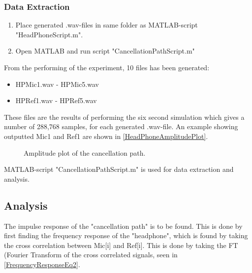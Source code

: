 \subsubsection{Data Extraction}
\begin{enumerate}
	\item Place generated .wav-files in same folder as MATLAB\textsuperscript{\textregistered}-script "HeadPhoneScript.m".
	\item Open MATLAB\textsuperscript{\textregistered} and run script "CancellationPathScript.m"
\end{enumerate}

From the performing of the experiment, 10 files has been generated:
\begin{itemize}
	\item HPMic1.wav - HPMic5.wav
	\item HPRef1.wav - HPRef5.wav
\end{itemize}

These files are the results of performing the six second simulation which gives a number of 288,768 samples, for each generated .wav-file.
An example showing outputted Mic1 and Ref1 are shown in  \autoref{HeadPhoneAmplitudePlot}.


\begin{figure}[H]
	\centering
	
	\caption{Amplitude plot of the cancellation path.}
	\label{HeadPhoneAmplitudePlot}
\end{figure}

MATLAB\textsuperscript{\textregistered}-script "CancellationPathScript.m" is used for data extraction and analysis.


\subsection{Analysis}
The impulse response of the "cancellation path" is to be found.
This is done by first finding the frequency response of the "headphone", which is found by taking the cross correlation between Mic[i] and Ref[i]. This is done by taking the FT (Fourier Transform of the cross correlated signals, seen in \autoref{FrequencyResponseEq2}.



